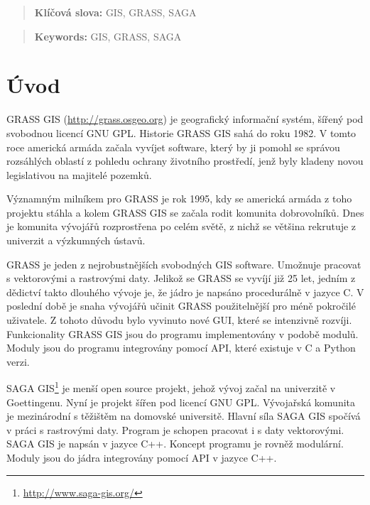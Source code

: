 \documentclass[a4paper,12pt]{article}
\author{Štěpán Turek}
\newcommand{\klicslova}[2]{\noindent\textbf{#1: }#2}
\newcommand{\necislovana}[1]{%
\phantomsection
\addcontentsline{toc}{section}{#1}
\section*{#1}
\markboth{\uppercase{#1}}{}
}
\begin{document}
\pagestyle{empty}


\newpage





\begin{abstract}

\bigskip

\klicslova{Klíčová slova}{GIS, GRASS, SAGA}

\end{abstract}

\begin{abstract}

\bigskip

\klicslova{Keywords}{GIS, GRASS, SAGA}

\end{abstract}


\newpage

\newpage
\tableofcontents


\newpage
\pagestyle{fancy}

\necislovana{Úvod}



GRASS GIS (\url{http://grass.osgeo.org}) je geografický informační systém, šířený  pod svobodnou licencí GNU GPL.  
Historie GRASS GIS sahá do roku 1982. V tomto roce americká armáda začala vyvíjet software, který by ji pomohl se správou rozsáhlých oblastí z pohledu ochrany 
životního prostředí, jenž byly kladeny novou legislativou na majitelé pozemků.
 
Významným milníkem pro GRASS je rok 1995, kdy se americká armáda z toho projektu stáhla a kolem GRASS GIS se začala rodit komunita dobrovolníků. 
Dnes je komunita vývojářů rozprostřena po celém světě, z nichž se většina rekrutuje z univerzit a výzkumných ústavů. 

GRASS je jeden z nejrobustnějších svobodných GIS software. Umožnuje pracovat s vektorovými a rastrovými daty.
Jelikož se GRASS se vyvíjí již 25 let, jedním z dědictví takto dlouhého vývoje je, že  jádro je napsáno procedurálně v jazyce C. 
V poslední době je snaha vývojářů učinit GRASS použitelnější pro méně pokročilé uživatele. Z tohoto důvodu bylo vyvinuto nové GUI, které se intenzivně rozvíji. 
Funkcionality GRASS GIS jsou do programu implementovány v podobě modulů. Moduly jsou do programu integrovány pomocí API, které existuje v C a Python verzi.

SAGA GIS\footnote{\url{http://www.saga-gis.org/}} je menší open source projekt, jehož vývoj začal na
 univerzitě v Goettingenu. Nyní je projekt šířen pod  licencí GNU GPL. Vývojařská 
komunita je mezinárodní s těžištěm na domovské universitě. Hlavní síla SAGA GIS spočívá v práci s rastrovými daty. Program je schopen pracovat i s daty vektorovými. 
SAGA GIS je napsán v jazyce  C++.  Koncept programu je rovněž modulární. Moduly jsou do jádra integrovány pomocí API v jazyce C++.
\end{document}
